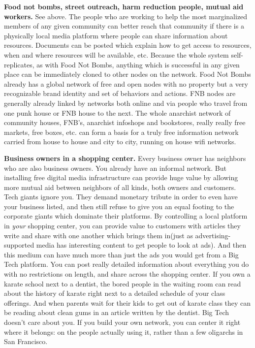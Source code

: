 \textbf{Food not bombs, street outreach, harm reduction people, mutual aid workers.}  See above.  The people who are working to help the most marginalized members of any given community can better reach that community if there is a physically local media platform where people can share information about resources.  Documents can be posted which explain how to get access to resources, when and where resources will be available, etc.  Because the whole system self-replicates, as with Food Not Bombs, anything which is successful in any given place can be immediately cloned to other nodes on the network.  Food Not Bombs already has a global network of free and open nodes with no property but a very recognizable brand identity and set of behaviors and actions.  FNB nodes are generally already linked by networks both online and via people who travel from one punk house or FNB house to the next.  The whole anarchist network of community houses, FNB's, anarchist infoshops and bookstores, really really free markets, free boxes, etc. can form a basis for a truly free information network carried from house to house and city to city, running on house wifi networks.  

\textbf{Business owners in a shopping center.}  Every business owner has neighbors who are also business owners.  You already have an informal network.  But installing free digital media infrastructure can provide huge value by allowing more mutual aid between neighbors of all kinds, both owners and customers.  Tech giants ignore you.  They demand monetary tribute in order to even have your business listed, and then still refuse to give you an equal footing to the corporate giants which dominate their platforms.  By controlling a local platform in \emph{your} shopping center, you can provide value to customers with articles they write and share with one another which brings them in(just as advertising-supported media has interesting content to get people to look at ads).  And then this medium can have much more than just the ads you would get from a Big Tech platform. You can post really detailed information about everything you do with no restrictions on length, and share across the shopping center.  If you own a karate school next to a dentist, the bored people in the waiting room can read about the history of karate right next to a detailed schedule of your class offerings.  And when parents wait for their kids to get out of karate class they can be reading about clean gums in an article written by the dentist.  Big Tech doesn't care about you.  If you build your own network, you can center it right where it belongs: on the people actually using it, rather than a few oligarchs in San Francisco. 

